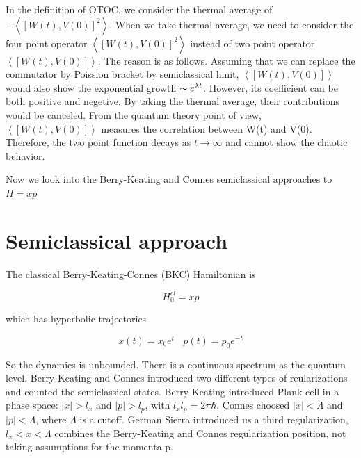 \documentclass[12pt]{report}
\newcommand*{\1}{\hspace{1pt}}
\begin{document}
    In the definition of OTOC, we consider the thermal average of $- \left\langle\left[W(t),V(0)\right]^{2}\right\rangle$. When we take thermal average, we need to 
    consider the four point operator $\left\langle\left[W(t),V(0)\right]^{2}\right\rangle$ instead of two point operator $\left\langle\left[W(t),V(0)\right]\right\rangle$.
    The reason is as follows. Assuming that we can replace the commutator by Poission bracket by semiclassical limit, $\left\langle\left[W(t),V(0)\right]\right\rangle$
    would also show the exponential growth $\thicksim  e^{\lambda t}$. However, its coefficient can be both positive and negetive. By taking the thermal average, their
    contributions would be canceled. From the quantum theory point of view, $\left\langle\left[W(t),V(0)\right]\right\rangle$ measures the correlation between W(t)
    and V(0). Therefore, the two point function decays as $t \rightarrow \infty$ and cannot show the chaotic behavior.

    Now we look into the Berry-Keating and Connes semiclassical approaches to $H=xp$

    \newpage
    \chapter{Semiclassical approach}

    The classical Berry-Keating-Connes (BKC) Hamiltonian is\cite{s1,s2}

    \begin{equation}
        H ^{cl} _{0} = xp
    \end{equation}

    which has hyperbolic trajectories 
    
    \begin{equation}
        x(t) = x_{0}e^{t}  \ \ \ \  p(t) = p_{0}e^{-t}
    \end{equation}

    So the dynamics is unbounded. There is a continuous spectrum as the quantum level. Berry-Keating and Connes introduced two different types of reularizations and counted
    the semiclassical states. Berry-Keating introduced Plank cell in a phase space: $|x| > l_{x}$ and $|p| > l_{p}$, with $l_{x}l_{p} = 2 \pi \hbar$. Connes 
    choosed $|x| < \Lambda $ and $|p| < \Lambda$, where $\Lambda$ is a cutoff. German Sierra introduced us a third regularization, $l_{x} < x < \Lambda$ combines
    the Berry-Keating and Connes regularization position, not taking assumptions for the momenta p. \
\end{document}
